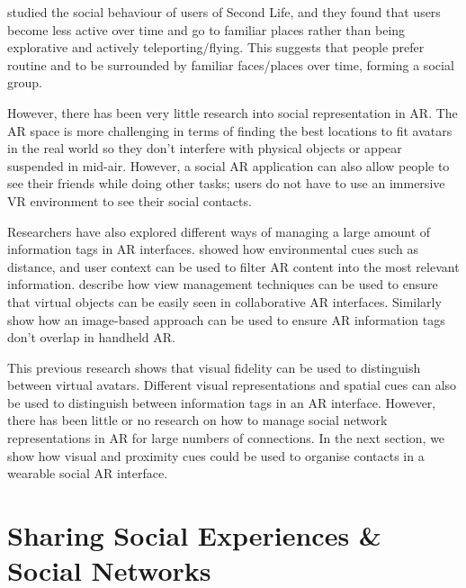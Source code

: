 \cite{Harris2009} studied the social behaviour of users of Second Life, and they found that users become less active over time and go to familiar places rather than being explorative and actively teleporting/flying. This suggests that people prefer routine and to be surrounded by familiar faces/places over time, forming a social group.

However, there has been very little research into social representation in AR. The AR space is more challenging in terms of finding the best locations to fit avatars in the real world so they don't interfere with physical objects or appear suspended in mid-air. However, a social AR application can also allow people to see their friends while doing other tasks; users do not have to use an immersive VR environment to see their social contacts.

Researchers have also explored different ways of managing a large amount of information tags in AR interfaces. \cite{Julier2002} showed how environmental cues such as distance, and user context can be used to filter AR content into the most relevant information. \cite{Hollerer2001} describe how view management techniques can be used to ensure that virtual objects can be easily seen in collaborative AR interfaces. Similarly \cite{Grasset2012} show how an image-based approach can be used to ensure AR information tags don't overlap in handheld AR. 

This previous research shows that visual fidelity can be used to distinguish between virtual avatars. Different visual representations and spatial cues can also be used to distinguish between information tags in an AR interface. However, there has been little or no research on how to manage social network representations in AR for large numbers of connections. In the next section, we show how visual and proximity cues could be used to organise contacts in a wearable social AR interface.


\section{Sharing Social Experiences \& Social Networks}


